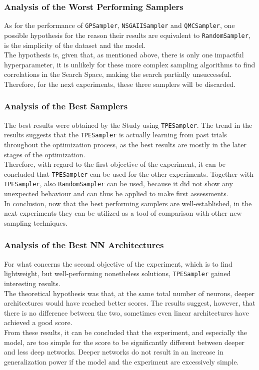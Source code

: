 \subsubsection{Analysis of the Worst Performing Samplers}

As for the performance of \texttt{GPSampler}, \texttt{NSGAIISampler} and \texttt{QMCSampler}, one possible hypothesis for the reason their results are equivalent to \texttt{RandomSampler}, is the simplicity of the dataset and the model.
\\[0.3cm]The hypothesis is, given that, as mentioned above, there is only one impactful hyperparameter, it is unlikely for these more complex sampling algorithms to find correlations in the Search Space, making the search partially unsuccessful.
Therefore, for the next experiments, these three samplers will be discarded.

\subsubsection{Analysis of the Best Samplers}

The best results were obtained by the Study using \texttt{TPESampler}. The trend in the results suggests that the \texttt{TPESampler} is actually learning from past trials throughout the optimization process, as the best results are mostly in the later stages of the optimization.
\\[0.3cm]Therefore, with regard to the first objective of the experiment, it can be concluded that \texttt{TPESampler} can be used for the other experiments. Together with \texttt{TPESampler}, also \texttt{RandomSampler} can be used, because it did not show any unexpected behaviour and can thus be applied to make first assessments.
\\[0.3cm]In conclusion, now that the best performing samplers are well-established, in the next experiments they can be utilized as a tool of comparison with other new sampling techniques. 

\subsubsection{Analysis of the Best NN Architectures}

For what concerns the second objective of the experiment, which is to find lightweight, but well-performing nonetheless solutions, \texttt{TPESampler} gained interesting results.
\\[0.3cm]The theoretical hypothesis was that, at the same total number of neurons, deeper architectures would have reached better scores. The results suggest, however, that there is no difference between the two, sometimes even linear architectures have achieved a good score.
\\[0.3cm]From these results, it can be concluded that the experiment, and especially the model, are too simple for the score to be significantly different between deeper and less deep networks. Deeper networks do not result in an increase in generalization power if the model and the experiment are excessively simple.

